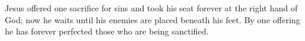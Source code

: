 \lettrine[lines=3]{J}{}esus offered one sacrifice for sins and took his seat forever at the right hand of God; now he waits until his enemies are placed beneath his feet. By one offering he has forever perfected those who are being sanctified.
